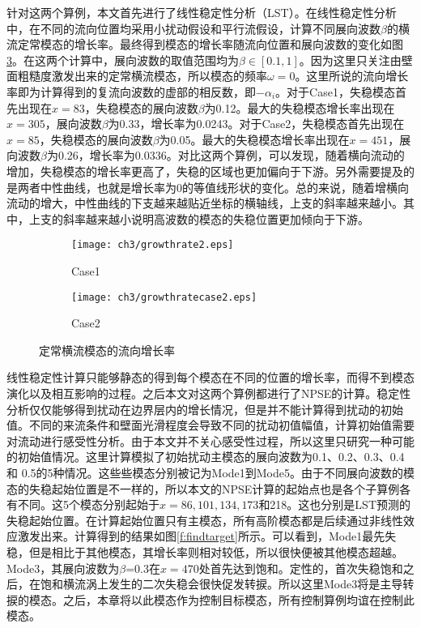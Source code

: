 针对这两个算例，本文首先进行了线性稳定性分析（LST）。在线性稳定性分析中，在不同的流向位置均采用小扰动假设和平行流假设，计算不同展向波数$\beta$的横流定常模态的增长率。最终得到模态的增长率随流向位置和展向波数的变化如图\ref{f:LST}。在这两个计算中，展向波数的取值范围均为$\beta\in[0.1,1]$。因为这里只关注由壁面粗糙度激发出来的定常横流模态，所以模态的频率$\omega = 0$。这里所说的流向增长率即为计算得到的复流向波数的虚部的相反数，即$-\alpha_i$。对于Case1，失稳模态首先出现在$x = 83$，失稳模态的展向波数$\beta$为0.12。最大的失稳模态增长率出现在$x =305$，展向波数$\beta$为0.33，增长率为0.0243。对于Case2，失稳模态首先出现在$x = 85$，失稳模态的展向波数$\beta$为0.05。最大的失稳模态增长率出现在$x =451$，展向波数$\beta$为0.26，增长率为0.0336。对比这两个算例，可以发现，随着横向流动的增加，失稳模态的增长率更高了，失稳的区域也更加偏向于下游。另外需要提及的是两者中性曲线，也就是增长率为0的等值线形状的变化。总的来说，随着增横向流动的增大，中性曲线的下支越来越贴近坐标的横轴线，上支的斜率越来越小。其中，上支的斜率越来越小说明高波数的模态的失稳位置更加倾向于下游。

\begin{figure}[htb]
  \centering
  \begin{subfigure}{0.48\linewidth}
    \texttt{[image: ch3/growthrate2.eps]}
    \caption{Case1}\label{modesenergycase3}
  \end{subfigure}
  \begin{subfigure}{0.48\linewidth}
    \texttt{[image: ch3/growthratecase2.eps]}
    \caption{Case2}\label{modesenergycase1}
  \end{subfigure}
  \caption{定常横流模态的流向增长率}\label{f:LST}
\end{figure}

线性稳定性计算只能够静态的得到每个模态在不同的位置的增长率，而得不到模态演化以及相互影响的过程。之后本文对这两个算例都进行了NPSE的计算。稳定性分析仅仅能够得到扰动在边界层内的增长情况，但是并不能计算得到扰动的初始值。不同的来流条件和壁面光滑程度会导致不同的扰动初值幅值，计算初始值需要对流动进行感受性分析。由于本文并不关心感受性过程，所以这里只研究一种可能的初始值情况。这里计算模拟了初始扰动主模态的展向波数为0.1、0.2、0.3、0.4和 0.5的5种情况。这些些模态分别被记为Mode1到Mode5。由于不同展向波数的模态的失稳起始位置是不一样的，所以本文的NPSE计算的起始点也是各个子算例各有不同。这5个模态分别起始于$x=86,101,134,173$和218。这也分别是LST预测的失稳起始位置。在计算起始位置只有主模态，所有高阶模态都是后续通过非线性效应激发出来。计算得到的结果如图\ref{f:findtarget}所示。可以看到，Mode1最先失稳，但是相比于其他模态，其增长率则相对较低，所以很快便被其他模态超越。Mode3，其展向波数为$\beta$=0.3在$x = 470$处首先达到饱和。定性的，首次失稳饱和之后，在饱和横流涡上发生的二次失稳会很快促发转捩。所以这里Mode3将是主导转捩的模态。之后，本章将以此模态作为控制目标模态，所有控制算例均谊在控制此模态。

